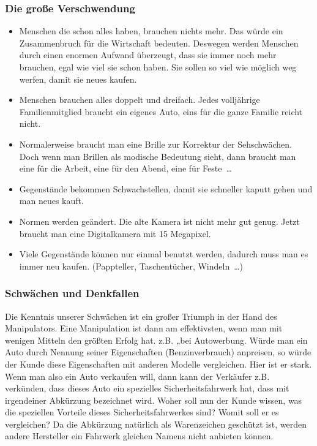\subsubsection{Die große Verschwendung}
\begin{itemize}
	\item Menschen die schon alles haben, brauchen nichts mehr. Das würde ein Zusammenbruch für die
Wirtschaft bedeuten. Deswegen werden Menschen durch einen enormen Aufwand überzeugt, dass sie immer
noch mehr brauchen, egal wie viel sie schon haben. Sie sollen so viel wie möglich weg werfen, damit
sie neues kaufen.

	\item Menschen brauchen alles doppelt und dreifach. Jedes volljährige Familienmitglied braucht
ein eigenes Auto, eins für die ganze Familie reicht nicht.
	\item Normalerweise braucht man eine Brille zur Korrektur der Sehschwächen. Doch wenn man Brillen
als modische Bedeutung sieht, dann braucht man eine für die Arbeit, eine für den Abend, eine für
Feste~\dots

	\item Gegenstände bekommen Schwachstellen, damit sie schneller kaputt gehen und man neues kauft.

	\item Normen werden geändert. Die alte Kamera ist nicht mehr gut genug. Jetzt braucht man eine
Digitalkamera mit 15 Megapixel.

	\item Viele Gegenstände können nur einmal benutzt werden, dadurch muss man es immer neu kaufen.
(Pappteller, Taschentücher, Windeln~\dots)
\end{itemize}

\subsubsection{Schwächen und Denkfallen}
Die Kenntnis unserer Schwächen ist ein großer Triumph in der Hand des Manipulators. Eine Manipulation
ist dann am effektivsten, wenn man mit wenigen Mitteln den größten Erfolg hat.
z.B. „bei Autowerbung. Würde man ein Auto durch Nennung seiner Eigenschaften (Benzinverbrauch)
anpreisen, so würde der Kunde diese Eigenschaften mit anderen Modelle vergleichen. Hier ist er stark.
Wenn man also ein Auto verkaufen will, dann kann der Verkäufer z.B. verkünden, dass dieses Auto ein
spezielles Sicherheitsfahrwerk hat, dass mit irgendeiner Abkürzung bezeichnet wird. Woher soll nun
der Kunde wissen, was die speziellen Vorteile dieses Sicherheitsfahrwerkes sind? Womit soll er es
vergleichen? Da die Abkürzung natürlich als Warenzeichen geschützt ist, werden andere Hersteller ein
Fahrwerk gleichen Namens nicht anbieten können.

